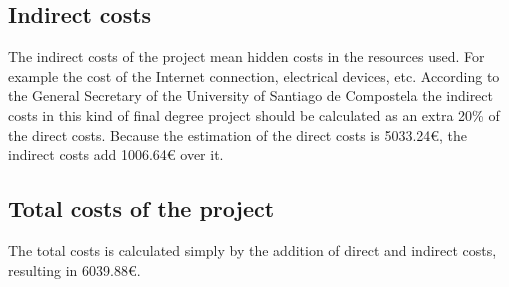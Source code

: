\subsection{Indirect costs}
The indirect costs of the project mean hidden costs in the resources used.
For example the cost of the Internet connection, electrical devices, etc.
\linej
According to the General Secretary of the University of Santiago de Compostela the indirect costs in this kind of final degree project should be calculated as an extra 20\% of the direct costs\cite{indirect_costs}.
\linej
\linej
Because the estimation of the direct costs is 5033.24\euro{}, the indirect costs add 1006.64\euro{} over it.

\subsection{Total costs of the project}
The total costs is calculated simply by the addition of direct and indirect costs, resulting in 6039.88\euro{}.
